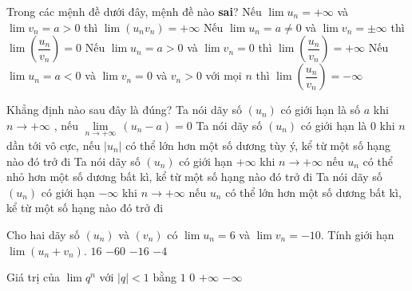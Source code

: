 \begin{ex}%
	Trong các  mệnh đề dưới đây, mệnh đề nào \textbf{sai}?
	\choice 
		{Nếu $\lim u_n=+\infty$ và $\lim v_n=a>0$ thì  $\lim\left(u_n v_n\right)=+\infty$}
		{ Nếu $\lim u_n=a \neq 0$ và $\lim v_n=  \pm \infty$ thì $\lim\left(\dfrac{u_n}{v_n}\right)=0$}
		{\True Nếu $\lim u_n=a>0$ và $\lim v_n=0$ thì $\lim\left(\dfrac{u_n}{v_n}\right)=+\infty$} 
		{ Nếu $\lim u_n=a<0$ và $\lim v_n=0$  và $v_n>0$ với mọi $n$ thì $\lim\left(\dfrac{u_n}{v_n}\right)=-\infty$}
\end{ex}

\begin{ex}%
	Khẳng định nào sau đây  là đúng?
	\choice 
		{\True Ta nói dãy số $\left(u_n\right)$ có giới hạn là số $a$ khi $n\to+\infty $ ,  nếu $\underset{n\to+\infty}{\lim}\,\left(u_n-a\right)=0$}
		{Ta nói dãy số $\left(u_n\right)$ có giới hạn là  $0$ khi $n$ dần tới vô cực, nếu $\left|u_n\right|$ có thể lớn hơn một số dương tùy ý, kể từ một số hạng nào đó trở đi}
		{Ta nói dãy số $\left(u_n\right)$ có giới hạn $+\infty $ khi $n\to+\infty $ nếu $u_n$ có thể nhỏ hơn một số dương bất kì, kể từ một số hạng nào đó  trở đi}
		{Ta nói dãy số $\left(u_n\right)$ có giới hạn $-\infty $ khi $n\to+\infty $ nếu $u_n$ có thể lớn hơn  một số dương bất kì, kể từ một số hạng nào đó trở đi}
\end{ex}

\begin{ex}%
	Cho hai dãy số $\left( u_n\right)$ và $\left( v_n\right)$  có $\lim
	u_n =6$ và  $\lim
	v_n =-10$. Tính giới hạn  $\lim
	(u_n+v_n)$. 
	\choice 
		{  $16$}
		 { $-60$}
		{$-16$} 
		{ \True $-4$} 
\end{ex}

\begin{ex}%
	Giá trị của $\lim q^n$ với $\left|q\right|<1$  bằng
	\choice 
		 {$1$}
		{\True $0$} 
		{$+\infty$} 
		 {$-\infty$}
\end{ex}

